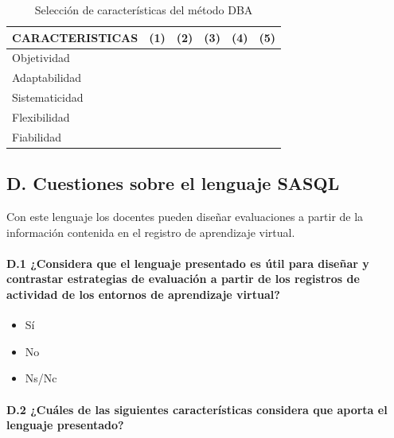 \begin{table}[H]
  \begin{center}
  \begin{tabular}{| m{5cm} | c | c | c | c | c |}
    \hline
    CARACTERISTICAS & (1) & (2) & (3) & (4) & (5) \\
    \hline
    \hline
    Objetividad &  &  & & & \\
    \hline
    Adaptabilidad &  &  & & & \\
    \hline
    Sistematicidad &  &  & & &  \\
    \hline
    Flexibilidad &  &  & & &  \\
    \hline
    Fiabilidad &  &  & & &  \\
    \hline
  \end{tabular}
\end{center}
\caption{Selección de características del método DBA}
\label{tab:ap:caracteristicas:metodo}
\end{table}

\newpage

\subsection*{D. Cuestiones sobre el lenguaje SASQL}

\begin{mdframed}[style=cuestionarioST]
	Con este lenguaje los docentes pueden diseñar evaluaciones a partir de la información contenida en el registro de aprendizaje virtual. 
\end{mdframed}

	\paragraph*{D.1 ¿Considera que el lenguaje presentado es útil para diseñar y contrastar estrategias de evaluación a partir de los registros de actividad de los entornos de aprendizaje virtual?}

\begin{mdframed}[style=cuestionarioST]
			\begin{itemize}
				\item Sí
				\item No
				\item Ns/Nc
			\end{itemize}
\end{mdframed}


	\paragraph*{D.2 ¿Cuáles de las siguientes características considera que aporta el lenguaje presentado?}

